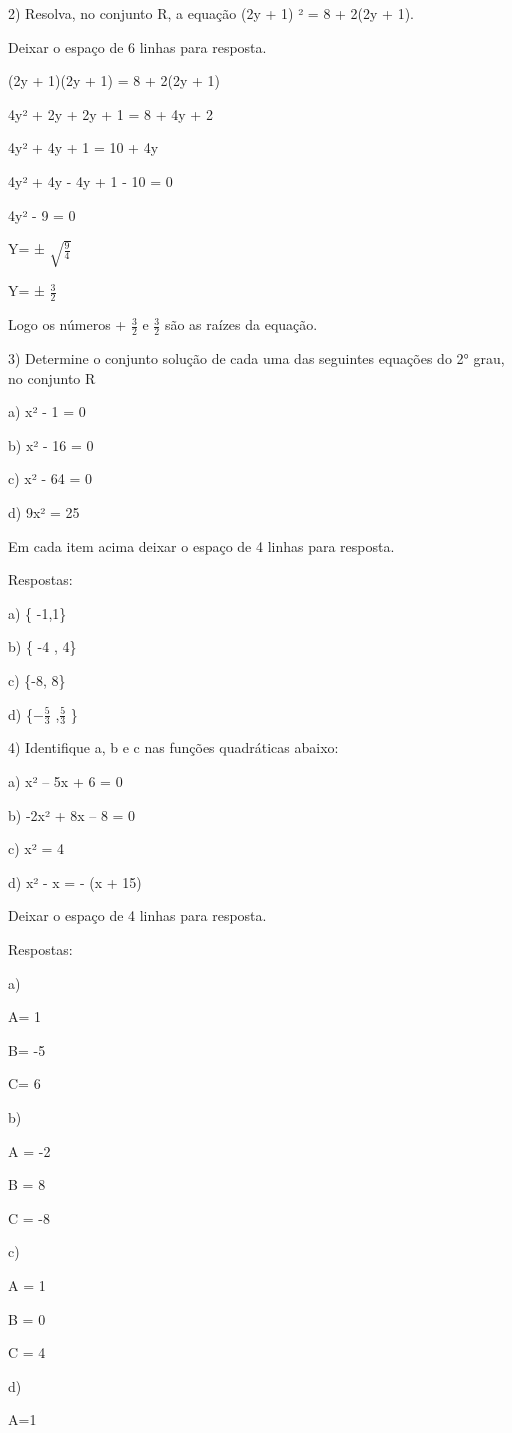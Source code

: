 2) Resolva, no conjunto R, a equação (2y + 1) ² = 8 + 2(2y + 1).

Deixar o espaço de 6 linhas para resposta.

(2y + 1)(2y + 1) = 8 + 2(2y + 1)

4y² + 2y + 2y + 1 = 8 + 4y + 2

4y² + 4y + 1 = 10 + 4y

4y² + 4y - 4y + 1 - 10 = 0

4y² - 9 = 0

Y= ± \(\sqrt{\frac{9}{4}}\)

Y= ± \(\frac{3}{2}\)

Logo os números + \(\frac{3}{2}\) e \(\frac{3}{2}\) são as raízes da
equação.

3) Determine o conjunto solução de cada uma das seguintes equações do 2°
grau, no conjunto R

a) x² - 1 = 0

b) x² - 16 = 0

c) x² - 64 = 0

d) 9x² = 25

Em cada item acima deixar o espaço de 4 linhas para resposta.

Respostas:

a) \{ -1,1\}

b) \{ -4 , 4\}

c) \{-8, 8\}

d) \{\(- \frac{5}{3}\) ,\(\frac{5}{3}\) \}

4) Identifique a, b e c nas funções quadráticas abaixo:

a) x² -- 5x + 6 = 0

b) -2x² + 8x -- 8 = 0

c) x² = 4

d) x² - x = - (x + 15)

Deixar o espaço de 4 linhas para resposta.

Respostas:

a)

A= 1

B= -5

C= 6

b)

A = -2

B = 8

C = -8

c)

A = 1

B = 0

C = 4

d)

A=1

